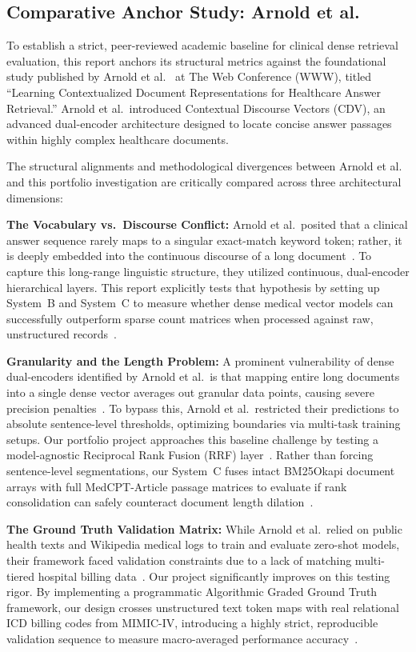 \documentclass[conference]{IEEEtran}
\begin{document}
\subsection{Comparative Anchor Study: Arnold et al.}
To establish a strict, peer-reviewed academic baseline for clinical dense retrieval evaluation, this report anchors its structural metrics against the foundational study published by Arnold et al.~\cite{arnold2020learning} at The Web Conference (WWW), titled ``Learning Contextualized Document Representations for Healthcare Answer Retrieval.'' Arnold et al.\ introduced Contextual Discourse Vectors (CDV), an advanced dual-encoder architecture designed to locate concise answer passages within highly complex healthcare documents.

The structural alignments and methodological divergences between Arnold et al.~\cite{arnold2020learning} and this portfolio investigation are critically compared across three architectural dimensions:

\textbf{The Vocabulary vs.\ Discourse Conflict:} Arnold et al.\ posited that a clinical answer sequence rarely maps to a singular exact-match keyword token; rather, it is deeply embedded into the continuous discourse of a long document~\cite{arnold2020learning}. To capture this long-range linguistic structure, they utilized continuous, dual-encoder hierarchical layers. This report explicitly tests that hypothesis by setting up System~B and System~C to measure whether dense medical vector models can successfully outperform sparse count matrices when processed against raw, unstructured records~\cite{jin2023medcpt}.

\textbf{Granularity and the Length Problem:} A prominent vulnerability of dense dual-encoders identified by Arnold et al.\ is that mapping entire long documents into a single dense vector averages out granular data points, causing severe precision penalties~\cite{arnold2020learning}. To bypass this, Arnold et al.\ restricted their predictions to absolute sentence-level thresholds, optimizing boundaries via multi-task training setups. Our portfolio project approaches this baseline challenge by testing a model-agnostic Reciprocal Rank Fusion (RRF) layer~\cite{cormack2009reciprocal}. Rather than forcing sentence-level segmentations, our System~C fuses intact BM25Okapi document arrays with full MedCPT-Article passage matrices to evaluate if rank consolidation can safely counteract document length dilation~\cite{jin2023medcpt,cormack2009reciprocal}.

\textbf{The Ground Truth Validation Matrix:} While Arnold et al.\ relied on public health texts and Wikipedia medical logs to train and evaluate zero-shot models, their framework faced validation constraints due to a lack of matching multi-tiered hospital billing data~\cite{arnold2020learning}. Our project significantly improves on this testing rigor. By implementing a programmatic Algorithmic Graded Ground Truth framework, our design crosses unstructured text token maps with real relational ICD billing codes from MIMIC-IV, introducing a highly strict, reproducible validation sequence to measure macro-averaged performance accuracy~\cite{johnson2023mimic}.
\end{document}
